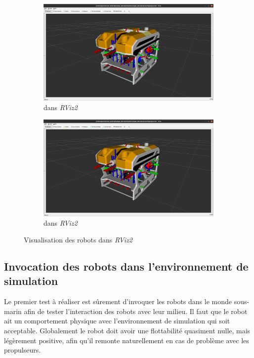 			\begin{figure}
				\centering
				\begin{subfigure}[t]{0.45\textwidth}
					\centering
					\includegraphics[width=\textwidth]{imgs/argos_rviz.png}
					\caption{\argos{} dans \textit{RViz2}}
					\label{fig:argos_rviz}
				\end{subfigure}
				\begin{subfigure}[t]{0.45\textwidth}
					\centering
					\includegraphics[width=\textwidth]{imgs/argos_rviz.png}
					\caption{\atoll{} dans \textit{RViz2}}
					\label{fig:argos_rviz}
				\end{subfigure}
				\caption{Visualisation des robots dans \textit{RViz2}}
				\label{fig:rviz2_robots}
			\end{figure}

		\subsection{Invocation des robots dans l'environnement de simulation}

			Le premier test à réaliser est sûrement d'invoquer les robots dans le monde sous-marin afin de tester l'interaction des robots avec leur milieu. Il faut que le robot ait un comportement physique avec l'environnement de simulation qui soit acceptable. Globalement le robot doit avoir une flottabilité quasiment nulle, mais légèrement positive, afin qu'il remonte naturellement en cas de problème avec les propulseurs.

